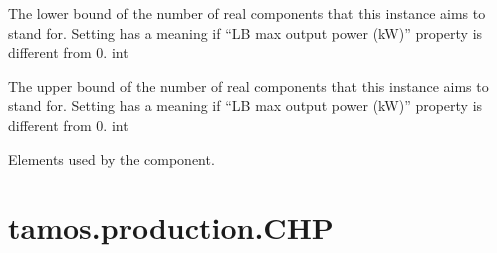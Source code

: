 \documentclass[letterpaper,10pt,english]{sphinxmanual}
\begin{document}
\begin{fulllineitems}
\begin{fulllineitems}
\label{\detokenize{generated/tamos.production.BiomassBoiler:tamos.production.BiomassBoiler.units_number_lb}}
\pysigstartsignatures
{}
\pysigstopsignatures
\sphinxAtStartPar
The lower bound of the number of real components that this instance aims to stand for.
Setting  has a meaning if “LB max output power (kW)” property is different from 0.
int

\end{fulllineitems}


\begin{fulllineitems}
\label{\detokenize{generated/tamos.production.BiomassBoiler:tamos.production.BiomassBoiler.units_number_ub}}
\pysigstartsignatures
{}
\pysigstopsignatures
\sphinxAtStartPar
The upper bound of the number of real components that this instance aims to stand for.
Setting  has a meaning if “LB max output power (kW)” property is different from 0.
int

\end{fulllineitems}


\begin{fulllineitems}
\label{\detokenize{generated/tamos.production.BiomassBoiler:tamos.production.BiomassBoiler.used_elements}}
\pysigstartsignatures
{}
\pysigstopsignatures
\sphinxAtStartPar
Elements used by the component.

\end{fulllineitems}


\end{fulllineitems}


\sphinxstepscope


\section{tamos.production.CHP}
\label{\detokenize{generated/tamos.production.CHP:tamos-production-chp}}\label{\detokenize{generated/tamos.production.CHP::doc}}
\end{document}
